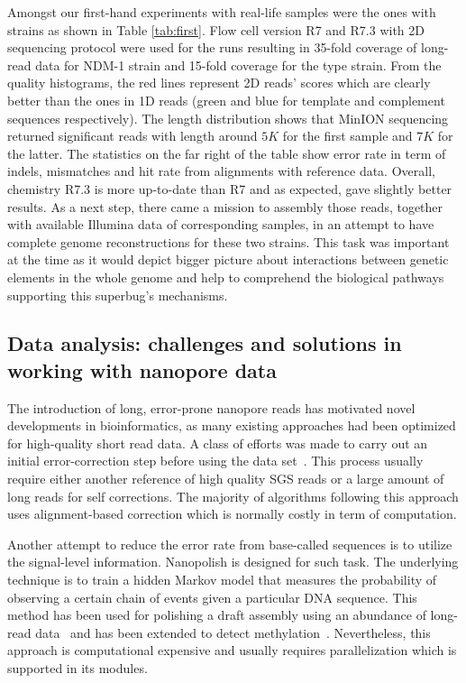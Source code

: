 Amongst our first-hand experiments with real-life samples were the ones with \kp{} strains as shown in Table \ref{tab:first}. Flow cell version R7 and R7.3 with 2D sequencing protocol were used for the runs resulting in 35-fold coverage of long-read data for NDM-1 strain and 15-fold coverage for the type strain. From the quality histograms, the red lines represent 2D reads' scores which are clearly better than the ones in 1D reads (green and blue for template and complement sequences respectively). The length distribution shows that MinION sequencing returned significant reads with length around $5K$ for the first sample and $7K$ for the latter. The statistics on the far right of the table show error rate in term of indels, mismatches and hit rate from alignments with reference data. Overall, chemistry R7.3 is more up-to-date than R7 and as expected, gave slightly better results. 
As a next step, there came a mission to assembly those reads, together with available Illumina data of corresponding samples, in an attempt to have complete genome reconstructions for these two \kp{} strains. This task was important at the time as it would depict bigger picture about interactions between genetic elements in the whole genome and help to comprehend the biological pathways supporting this superbug's mechanisms.   

\subsection{Data analysis: challenges and solutions in working with nanopore data}
The introduction of long, error-prone nanopore reads has motivated novel developments in bioinformatics, as many existing approaches had been optimized for high-quality short read data.
A class of efforts was made to carry out an initial error-correction step before using the data set~\cite{GoodwinGE2015,MadouiEC2015}. 
This process usually require either another reference of high quality SGS reads or a large amount of long reads for self corrections.
The majority of algorithms following this approach uses alignment-based correction which is normally costly in term of computation.

Another attempt to reduce the error rate from base-called sequences is to utilize the signal-level information. Nanopolish is designed for such task. The underlying technique is to train a hidden Markov model that measures the probability of observing a certain chain of events given a particular DNA sequence. This method has been used for polishing a draft assembly using an abundance of long-read data~\cite{LomanQS2015} and has been extended to detect methylation~\cite{Simpson2017methylation}. Nevertheless, this approach is computational expensive and usually requires parallelization which is supported in its modules.


